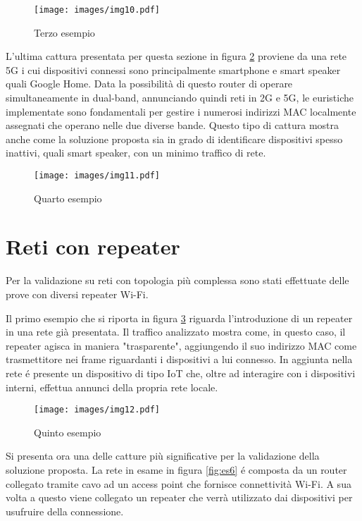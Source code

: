 
\begin{figure}[!h]
	\centering
	\texttt{[image: images/img10.pdf]}
	\caption{Terzo esempio}
	\label{fig:es3}
\end{figure}


L'ultima cattura presentata per questa sezione in figura \ref{fig:es4} proviene da una rete 5G i cui dispositivi connessi sono principalmente smartphone e smart speaker quali Google Home.
Data la possibilit\`a di questo router di operare simultaneamente in dual-band, annunciando quindi reti in 2G e 5G, le euristiche implementate sono fondamentali per gestire i numerosi indirizzi MAC localmente assegnati che operano nelle due diverse bande.
Questo tipo di cattura mostra anche come la soluzione proposta sia in grado di identificare dispositivi spesso inattivi, quali smart speaker, con un minimo traffico di rete. 


\begin{figure}[!h]
	\centering
	\texttt{[image: images/img11.pdf]}
	\caption{Quarto esempio}
	\label{fig:es4}
\end{figure}


\newpage

\section{Reti con repeater}

Per la validazione su reti con topologia pi\`u complessa sono stati effettuate delle prove con diversi repeater Wi-Fi.

Il primo esempio che si riporta in figura \ref{fig:es5} riguarda l'introduzione di un repeater in una rete gi\`a presentata.
Il traffico analizzato mostra come, in questo caso, il repeater agisca in maniera "trasparente", aggiungendo il suo indirizzo MAC come trasmettitore nei frame riguardanti i dispositivi a lui connesso.
In aggiunta nella rete \'e presente un dispositivo di tipo IoT che, oltre ad interagire con i dispositivi interni, effettua annunci della propria rete locale.

\begin{figure}[!h]
	\centering
	\texttt{[image: images/img12.pdf]}
	\caption{Quinto esempio}
	\label{fig:es5}
\end{figure}


Si presenta ora una delle catture pi\`u significative per la validazione della soluzione proposta.
La rete in esame in figura \ref{fig:es6} \'e composta da un router collegato tramite cavo ad un access point che fornisce connettivit\`a Wi-Fi.
A sua volta a questo viene collegato un repeater che verr\`a utilizzato dai dispositivi per usufruire della connessione.

